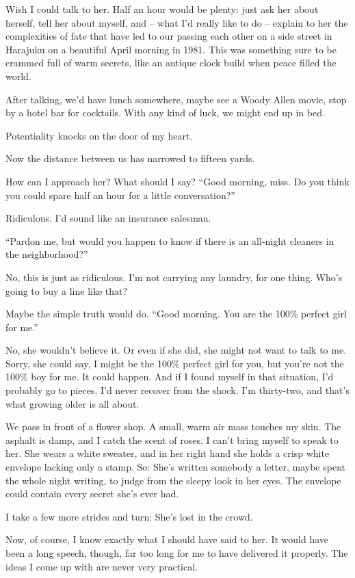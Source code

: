 \documentclass[10pt,a4paper]{article}
\begin{document}
Wish I could talk to her. Half an hour would be plenty: just ask her about herself, tell her about myself, and -- what I’d really like to do -- explain to her the complexities of fate that have led to our passing each other on a side street in Harajuku on a beautiful April morning in 1981. This was something sure to be crammed full of warm secrets, like an antique clock build when peace filled the world.

After talking, we’d have lunch somewhere, maybe see a Woody Allen movie, stop by a hotel bar for cocktails. With any kind of luck, we might end up in bed.

Potentiality knocks on the door of my heart.

Now the distance between us has narrowed to fifteen yards.

How can I approach her? What should I say?
“Good morning, miss. Do you think you could spare half an hour for a little conversation?”

Ridiculous. I’d sound like an insurance salesman.

“Pardon me, but would you happen to know if there is an all-night cleaners in the neighborhood?”

No, this is just as ridiculous. I’m not carrying any laundry, for one thing. Who’s going to buy a line like that?

Maybe the simple truth would do. “Good morning. You are the 100\% perfect girl for me.”

No, she wouldn’t believe it. Or even if she did, she might not want to talk to me. Sorry, she could say, I might be the 100\% perfect girl for you, but you’re not the 100\% boy for me. It could happen. And if I found myself in that situation, I’d probably go to pieces. I’d never recover from the shock. I’m thirty-two, and that’s what growing older is all about.

We pass in front of a flower shop. A small, warm air mass touches my skin. The asphalt is damp, and I catch the scent of roses. I can’t bring myself to speak to her. She wears a white sweater, and in her right hand she holds a crisp white envelope lacking only a stamp. So: She’s written somebody a letter, maybe spent the whole night writing, to judge from the sleepy look in her eyes. The envelope could contain every secret she’s ever had.

I take a few more strides and turn: She’s lost in the crowd.

Now, of course, I know exactly what I should have said to her. It would have been a long speech, though, far too long for me to have delivered it properly. The ideas I come up with are never very practical.
\end{document}
